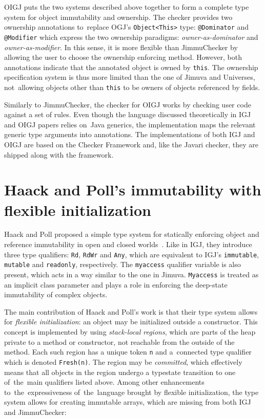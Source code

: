 \documentclass{pracamgr}
\theoremstyle{break}
\theoremstyle{break}
\theoremstyle{break}
\begin{document}
OIGJ puts the two systems described above together to form a complete
type system for object immutability and ownership. The checker
provides two ownership annotations to~replace OGJ's
\texttt{Object<This>} type: \texttt{@Dominator} and \texttt{@Modifier}
which express the two ownership paradigms: \emph{owner-as-dominator}
and \emph{owner-as-modifier}. In this sense, it is more flexible than
JimmuChecker by allowing the user to choose the ownership enforcing
method. However, both annotations indicate that the annotated object
is owned by \texttt{this}. The ownership specification system is thus
more limited than the one of Jimuva and Universes, not~allowing
objects other than \texttt{this} to be owners of objects referenced by
fields.

Similarly to JimmuChecker, the checker for OIGJ works by checking
user code against a set of rules. Even though the language discussed
theoretically in IGJ and OIGJ papers relies on~Java generics, the
implementation maps the relevant generic type arguments into
annotations. The implementations of both IGJ and OIGJ are based on the
Checker Framework and, like the Javari checker, they are shipped along
with the framework.

\section{Haack and Poll's immutability with flexible initialization}

Haack and Poll proposed a simple type system for statically enforcing
object and reference immutability in open and closed
worlds~\cite{flexible}. Like in IGJ, they introduce three type
qualifiers: \texttt{Rd}, \texttt{RdWr} and \texttt{Any}, which are
equivalent to IGJ's \texttt{immutable}, \texttt{mutable} and
\texttt{readonly}, respectively. The \texttt{myaccess} qualifier
variable is also present, which acts in a way similar to the one in
Jimuva. \texttt{Myaccess} is treated as an implicit class parameter
and plays a role in enforcing the deep-state immutability of complex
objects.

The main contribution of Haack and Poll's work is that their type
system allows for \emph{flexible initialization}: an object may be
initialized outside a constructor.  This concept is implemented by
using \emph{stack-local regions}, which are parts of the heap private
to a method or constructor, not reachable from the outside of the
method. Each such region has a unique token \texttt{n} and a~connected
type qualifier which is denoted \texttt{Fresh(n)}. The region may be
\emph{committed}, which effectively means that all objects in the
region undergo a typestate transition to one of~the~main qualifiers
listed above. Among other enhancements to~the~expressiveness
of~the~language brought by flexible initialization, the type system
allows for creating immutable arrays, which are missing from both IGJ
and JimmuChecker:
\end{document}
